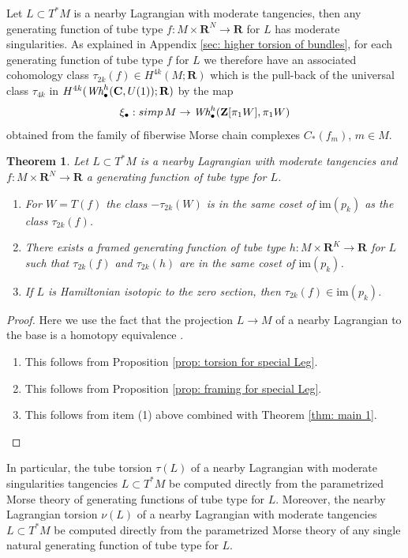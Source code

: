 \documentclass{amsart}
\def\bC{\mathbf{C}}
\def\bR{\mathbf{R}}
\def\bZ{\mathbf{Z}}
\newtheorem{theorem}{Theorem}[section]
\theoremstyle{definition}
\theoremstyle{remark}
\newtheorem{inductive lemma}[theorem]{Inductive Lemma}
\begin{document}
Let $L \subset T^*M$ is a nearby Lagrangian with moderate tangencies, then any generating function of tube type $f:M \times \bR^N \to \bR$ for $L$ has moderate singularities.  As explained in Appendix \ref{sec: higher torsion of bundles}, for each generating function of tube type $f$ for $L$ we therefore have an associated cohomology class 
 $\tau_{2k}(f) \in H^{4k}(M;\bR)$ which is the pull-back of the universal class $\tau_{4k}$ in  $H^{4k}(\text{\em Wh}_\bullet^h(\bC,U(1));\bR)$ by the map
$$ \xi_\bullet: simp\,M\to \text{\em Wh}_\bullet^h(\bZ[\pi_1W],\pi_1W) $$
obtained from the family of fiberwise Morse chain complexes $C_*(f_m)$, $m \in M$.
\begin{theorem}
Let $L \subset T^*M$ is a nearby Lagrangian with moderate tangencies and $f:M \times \bR^N \to \bR$  a generating function of tube type for $L$. 
\begin{enumerate}
\item For $W=T(f)$ the class $-\tau_{2k}(W)$ is in the same coset of $\text{im}(p_k)$ as the class $\tau_{2k}(f)$.
\item There exists a framed generating function of tube type $h:M \times \bR^K \to \bR$ for $L$ such that $\tau_{2k}(f)$ and $\tau_{2k}(h)$ are in the same coset of $\text{im}(p_k)$.
\item If $L$ is Hamiltonian isotopic to the zero section, then $\tau_{2k}(f) \in \text{im}(p_k)$.
\end{enumerate}
\end{theorem}

\begin{proof} Here we use the fact that the projection $L \to M$ of a nearby Lagrangian to the base is a homotopy equivalence \cite{A12}.
\begin{enumerate} 
\item This follows from Proposition \ref{prop: torsion for special Leg}.
\item This follows from Proposition \ref{prop: framing for special Leg}.
\item This follows from item (1) above combined with Theorem \ref{thm: main 1}.
\end{enumerate}
\end{proof}




In particular, the tube torsion $\tau(L)$ of a nearby Lagrangian with moderate singularities tangencies $L \subset T^*M$ be computed directly from the parametrized Morse theory of generating functions of tube type for $L$. Moreover, the nearby Lagrangian torsion $\nu(L)$ of a nearby Lagrangian with moderate tangencies $L \subset T^*M$ be computed directly from the parametrized Morse theory of any single natural generating function of tube type for $L$. 
\end{document}
